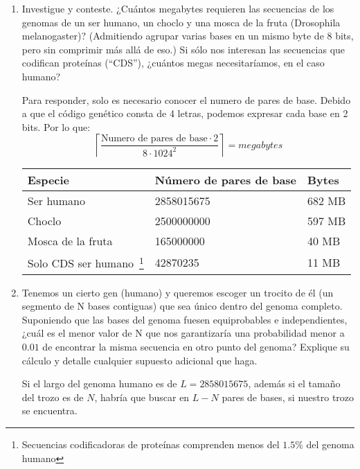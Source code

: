 \begin{enumerate}
\item Investigue y conteste.
	¿Cuántos megabytes requieren las secuencias
	de los genomas de un ser humano, un choclo y una mosca
	de la fruta (Drosophila melanogaster)?
	(Admitiendo agrupar varias bases en un mismo byte de
	8 bits, pero sin comprimir más allá de eso.)
	Si sólo nos interesan las secuencias que codifican
	proteínas (“CDS”), ¿cuántos megas necesitaríamos,
	en el caso humano?
	
		Para responder, solo es necesario conocer el
		numero de pares de base.
		Debido a que el código genético consta de 4 letras,
		podemos expresar cada base en 2 bits. Por lo que: \\

		$$\left\lceil \frac{\text{Numero de pares de base} \cdot 2}{8 \cdot 1024^2} \right\rceil = megabytes$$

		\begin{center}
		\begin{tabular}{|l|l|l|}
		\hline
			\textbf{Especie}  & \textbf{Número de pares de base} & \textbf{Bytes} \\\hline
			Ser humano        & 2858015675 & 682 MB\\
			Choclo            & 2500000000 & 597 MB\\
			Mosca de la fruta & 165000000  & 40 MB\\
			Solo CDS ser humano~\footnote{Secuencias
				codificadoras de proteínas comprenden menos del $1.5\%$ del genoma humano}
							  & 42870235   & 11 MB\\\hline
		\end{tabular}
		\end{center}


\item Tenemos un cierto gen (humano) y queremos escoger un
	trocito de él (un segmento de N bases contiguas) que sea
	único dentro del genoma completo.
	Suponiendo que las bases del genoma fuesen equiprobables e
	independientes,
	¿cuál es el menor valor de N que nos garantizaría una probabilidad
	menor a $0.01$ de encontrar la misma secuencia en otro punto del
	genoma? Explique su cálculo y detalle cualquier supuesto adicional
	que haga.


		Si el largo del genoma humano es de $L = 2858015675$,
		además si el tamaño del trozo es de $N$, habría que buscar en
		$L - N$ pares de bases, si nuestro trozo se encuentra.\\


\end{enumerate}
